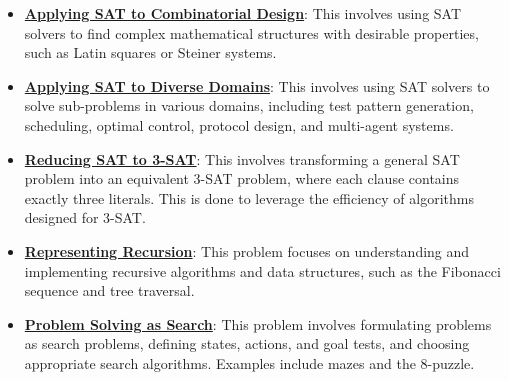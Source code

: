 \documentclass{article}%
\begin{document}
\begin{itemize}[leftmargin=*]
\item \href{https://purdue.brightspace.com/d2l/common/assets/pdfjs-d2l-dist/1.0.14-legacy/web/viewer.html?file=%2Fcontent%2Fenforced%2F1095467-wl.202510.CS.24300.001%2F13L1-Logic.pdf%3Fou%3D1095467&lang=en-us&container=d2l-fileviewer-rendered-pdf&fullscreen=d2l-fileviewer-rendered-pdf-dialog&height=667#page=22}{\textbf{Applying SAT to Combinatorial Design}}: This involves using SAT solvers to find complex mathematical structures with desirable properties, such as Latin squares or Steiner systems.%
\item \href{https://purdue.brightspace.com/d2l/common/assets/pdfjs-d2l-dist/1.0.14-legacy/web/viewer.html?file=%2Fcontent%2Fenforced%2F1095467-wl.202510.CS.24300.001%2F13L1-Logic.pdf%3Fou%3D1095467&lang=en-us&container=d2l-fileviewer-rendered-pdf&fullscreen=d2l-fileviewer-rendered-pdf-dialog&height=667#page=23}{\textbf{Applying SAT to Diverse Domains}}: This involves using SAT solvers to solve sub-problems in various domains, including test pattern generation, scheduling, optimal control, protocol design, and multi-agent systems.%
\item \href{https://purdue.brightspace.com/d2l/common/assets/pdfjs-d2l-dist/1.0.14-legacy/web/viewer.html?file=%2Fcontent%2Fenforced%2F1095467-wl.202510.CS.24300.001%2F13L1-Logic.pdf%3Fou%3D1095467&lang=en-us&container=d2l-fileviewer-rendered-pdf&fullscreen=d2l-fileviewer-rendered-pdf-dialog&height=667#page=24}{\textbf{Reducing SAT to 3-SAT}}: This involves transforming a general SAT problem into an equivalent 3-SAT problem, where each clause contains exactly three literals. This is done to leverage the efficiency of algorithms designed for 3-SAT.%
\item \href{https://purdue.brightspace.com/d2l/common/assets/pdfjs-d2l-dist/1.0.14-legacy/web/viewer.html?file=%2Fcontent%2Fenforced%2F1095467-wl.202510.CS.24300.001%2F14L1-DepthFS.pdf%3Fou%3D1095467&lang=en-us&container=d2l-fileviewer-rendered-pdf&fullscreen=d2l-fileviewer-rendered-pdf-dialog&height=667#page=3}{\textbf{Representing Recursion}}: This problem focuses on understanding and implementing recursive algorithms and data structures, such as the Fibonacci sequence and tree traversal.%
\item \href{https://purdue.brightspace.com/d2l/common/assets/pdfjs-d2l-dist/1.0.14-legacy/web/viewer.html?file=%2Fcontent%2Fenforced%2F1095467-wl.202510.CS.24300.001%2F14L1-DepthFS.pdf%3Fou%3D1095467&lang=en-us&container=d2l-fileviewer-rendered-pdf&fullscreen=d2l-fileviewer-rendered-pdf-dialog&height=667#page=12}{\textbf{Problem Solving as Search}}: This problem involves formulating problems as search problems, defining states, actions, and goal tests, and choosing appropriate search algorithms. Examples include mazes and the 8-puzzle.%

\end{itemize}
\end{document}
